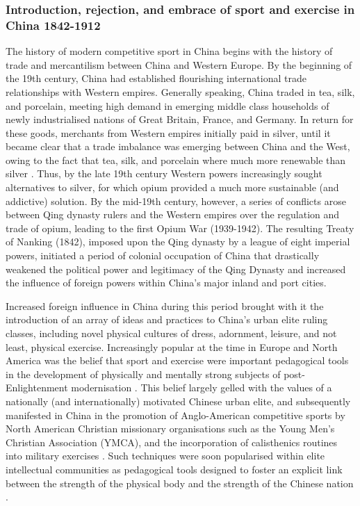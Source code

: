 \begin{CJK}{UTF8}{gbsn}
  \subsubsection{Introduction, rejection, and embrace of sport and exercise in China 1842-1912}

The history of modern competitive sport in China begins with the history of trade and mercantilism between China and Western Europe.
By the beginning of the 19th century, China had established flourishing international trade relationships with Western empires.  Generally speaking, China traded in tea, silk, and porcelain, meeting high demand in emerging middle class households of newly industrialised nations of Great Britain, France, and Germany.  In return for these goods, merchants from Western empires initially paid in silver, until it became clear that a trade imbalance was emerging between China and the West, owing to the fact that tea, silk, and porcelain where much more renewable than silver \citep{Fay2005}.  Thus, by the late 19th century Western powers increasingly sought alternatives to silver, for which opium provided a much more sustainable (and addictive) solution.  By the mid-19th century, however, a series of conflicts arose between Qing dynasty rulers and the Western empires over the regulation and trade of opium, leading to the first Opium War (1939-1942).  The resulting Treaty of Nanking (1842), imposed upon the Qing dynasty by a league of eight imperial powers, initiated a period of colonial occupation of China that drastically weakened the political power and legitimacy of the Qing Dynasty and increased the influence of foreign powers within China's major inland and port cities.

Increased foreign influence in China during this period brought with it the introduction of an array of ideas and practices to China's urban elite ruling classes, including novel physical cultures of dress, adornment, leisure, and not least, physical exercise.  Increasingly popular at the time in Europe and North America was the belief that sport and exercise were important pedagogical tools in the development of physically and mentally strong subjects of post-Enlightenment modernisation \citep{Elias1986}.  This belief largely gelled with the values of a nationally (and internationally) motivated Chinese urban elite, and subsequently manifested in China in the promotion of Anglo-American competitive sports by North American Christian missionary organisations such as the Young Men’s Christian Association (YMCA), and the incorporation of calisthenics routines into military exercises \citep[240]{Morris2004}.  Such techniques were soon popularised within elite intellectual communities as pedagogical tools designed to foster an explicit link between the strength of the physical body and the strength of the Chinese nation \cites[32]{Morris2004}[49]{Brownell1995}.


\end{CJK}
